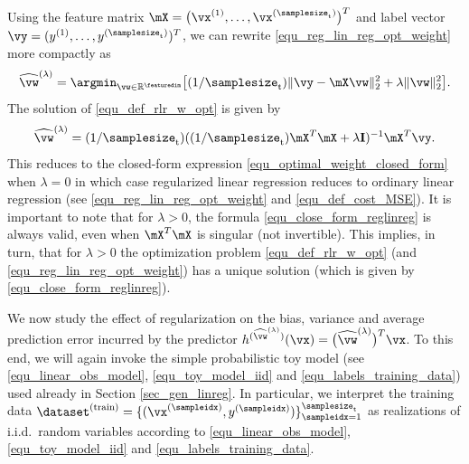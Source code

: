 \documentclass[12pt]{report}
\begin{document}
Using the feature matrix $\mX=\big(\vx^{(1)},\ldots,\vx^{(\samplesize_{\rm t})}\big)^{T}$ 
and label vector $\vy=(y^{(1)},\ldots,y^{(\samplesize_{\rm t})})^{T}$, 
we can rewrite \eqref{equ_reg_lin_reg_opt_weight} more compactly as 
\begin{equation} 
\label{equ_def_rlr_w_opt}
\widehat{\vw}^{(\lambda)} = \argmin_{\vw \in \mathbb{R}^{\featuredim}} \big[ (1/\samplesize_{\rm t}) \| \vy - \mX \vw \|^{2}_{2} + \lambda \| \vw \|^{2}_{2}\big].
\end{equation} 
The solution of \eqref{equ_def_rlr_w_opt} is given by 
\begin{equation}
\label{equ_close_form_reglinreg}
\widehat{\vw}^{(\lambda)} = (1/\samplesize_{\rm t}) ((1/\samplesize_{\rm t}) \mX^{T} \mX + \lambda \mathbf{I})^{-1} \mX^{T} \vy. 
\end{equation}
This reduces to the closed-form expression \eqref{equ_optimal_weight_closed_form} 
when $\lambda=0$ in which case regularized linear regression reduces to ordinary linear 
regression (see \eqref{equ_reg_lin_reg_opt_weight} and \eqref{equ_def_cost_MSE}). It 
is important to note that for $\lambda>0$, the formula \eqref{equ_close_form_reglinreg} 
is always valid, even when $\mX^{T} \mX$ is singular (not invertible). This implies, in turn, 
that for $\lambda> 0$ the optimization problem \eqref{equ_def_rlr_w_opt} (and \eqref{equ_reg_lin_reg_opt_weight}) 
has a unique solution (which is given by \eqref{equ_close_form_reglinreg}). 

We now study the effect of regularization on the bias, variance 
and average prediction error incurred by the predictor $h^{(\widehat{\vw}^{(\lambda)})}(\vx) = \big(\widehat{\vw}^{(\lambda)}\big)^{T} \vx$. 
To this end, we will again invoke the simple probabilistic toy 
model (see \eqref{equ_linear_obs_model}, \eqref{equ_toy_model_iid} 
and \eqref{equ_labels_training_data}) used already in Section \ref{sec_gen_linreg}. 
In particular, we interpret the training data $\dataset^{(\rm train)} = \{ (\vx^{(\sampleidx)},y^{(\sampleidx)}) \}_{\sampleidx=1}^{\samplesize_{\rm t}}$ 
as realizations of i.i.d.\ random variables according to \eqref{equ_linear_obs_model}, 
\eqref{equ_toy_model_iid} and \eqref{equ_labels_training_data}. 
\end{document}
